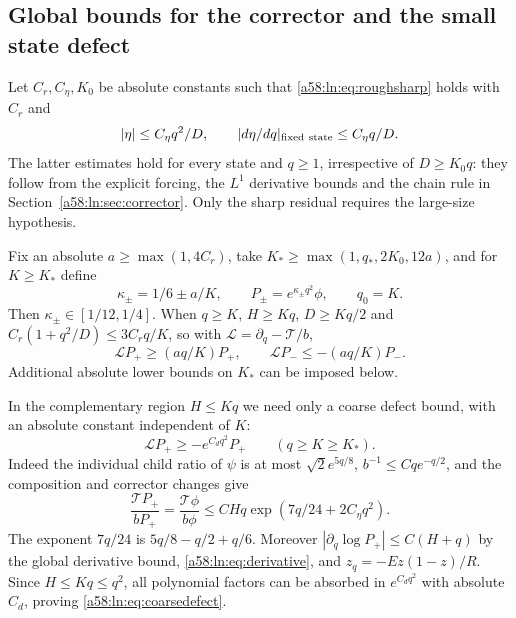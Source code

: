 \documentclass[11pt,letterpaper]{article}
\theoremstyle{remark}
\newcommand{\TT}{\mathcal T}
\begin{document}
\subsection{Global bounds for the corrector and the small state defect}
Let $C_r,C_\eta,K_0$ be absolute constants such that
\eqref{a58:ln:eq:roughsharp} holds with $C_r$ and
\[
 |\eta|\le C_\eta q^2/D,\qquad
 |d\eta/dq|_{\rm fixed\ state}\le C_\eta q/D.
\]
The latter estimates hold for every state and $q\ge1$, irrespective of
$D\ge K_0q$: they follow from the explicit forcing, the $L^1$ derivative
bounds and the chain rule in Section~\ref{a58:ln:sec:corrector}. Only the sharp
residual requires the large-size hypothesis.

Fix an absolute $a\ge\max(1,4C_r)$, take
$K_*\ge\max(1,q_*,2K_0,12a)$, and for $K\ge K_*$ define
\[
 \kappa_\pm=1/6\pm a/K,\qquad P_\pm=e^{\kappa_\pm q^2}\phi,
 \qquad q_0=K.
\]
Then $\kappa_\pm\in[1/12,1/4]$. When $q\ge K$, $H\ge Kq$,
$D\ge Kq/2$ and $C_r(1+q^2/D)\le3C_rq/K$, so with
$\mathcal L=\partial_q-\TT/b$,
\begin{equation}\label{a58:ln:eq:quantsharp}
 \mathcal LP_+\ge(aq/K)P_+,\qquad
 \mathcal LP_-\le-(aq/K)P_-.
\end{equation}
Additional absolute lower bounds on $K_*$ can be imposed below.

In the complementary region $H\le Kq$ we need only a coarse defect
bound, with an absolute constant independent of $K$:
\begin{equation}\label{a58:ln:eq:coarsedefect}
 \mathcal LP_+\ge-e^{C_dq^2}P_+\qquad(q\ge K\ge K_*).
\end{equation}
Indeed the individual child ratio of $\psi$ is at most
$\sqrt2e^{5q/8}$, $b^{-1}\le Cqe^{-q/2}$, and the composition and
corrector changes give
\[
 \frac{\TT P_+}{bP_+}=\frac{\TT\phi}{b\phi}
 \le CHq\exp(7q/24+2C_\eta q^2).
\]
The exponent $7q/24$ is $5q/8-q/2+q/6$. Moreover
$|\partial_q\log P_+|\le C(H+q)$ by the global derivative bound,
\eqref{a58:ln:eq:derivative}, and $z_q=-Ez(1-z)/R$.
Since $H\le Kq\le q^2$, all polynomial factors can be absorbed in
$e^{C_dq^2}$ with absolute $C_d$, proving \eqref{a58:ln:eq:coarsedefect}.
\end{document}
